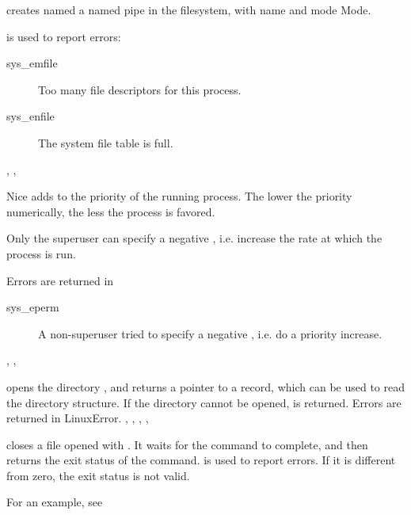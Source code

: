 

{ creates named a named pipe in the filesystem, with name
 and mode {Mode}. 
}
{  is used to report errors:
\begin{description}
\item[sys\_emfile] Too many file descriptors for this process.
\item[sys\_enfile] The system file table is full.
\end{description}
}
{, , }

{Nice adds  to the priority of the running process. The lower the
priority numerically, the less the process is favored.

Only the superuser can specify a negative , i.e. increase the rate at
which the process is run.
}
{ Errors are returned in 
\begin{description}
\item [sys\_eperm] A non-superuser tried to specify a negative , i.e.
do a priority increase.
\end{description}
}{, , }



{  opens the directory  , and returns a 
pointer to a  record, which can be used to read the directory 
structure. If the directory cannot be opened,  is returned.}
{Errors are returned in LinuxError.}
{, , , ,
}



{  closes a file opened with . It waits for the
command to complete, and then returns the exit status of the command. 
}
{ is used to report errors. If it is different from zero,
the exit status is not valid.}
{}

For an example, see 

